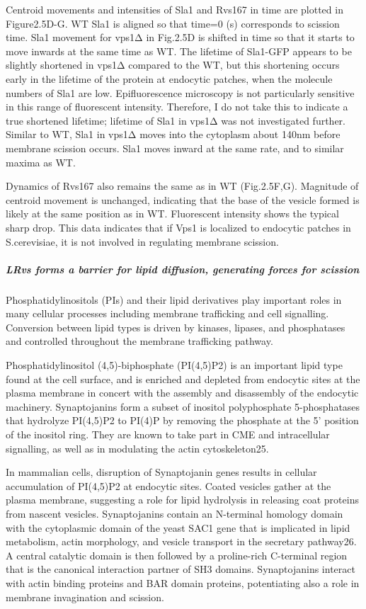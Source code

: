 Centroid movements and intensities of Sla1 and Rvs167 in time are plotted in Figure2.5D-G. WT Sla1 is aligned so that time=0 (s) corresponds to scission time. Sla1 movement for vps1Δ in Fig.2.5D is shifted in time so that it starts to move inwards at the same time as WT. The lifetime of Sla1-GFP appears to be slightly shortened in vps1Δ compared to the WT, but this shortening occurs early in the lifetime of the protein at endocytic patches, when the molecule numbers of Sla1 are low. Epifluorescence microscopy is not particularly sensitive in this range of fluorescent intensity. Therefore, I do not take this to indicate a true shortened lifetime; lifetime of Sla1 in vps1Δ was not investigated further. Similar to WT, Sla1 in vps1Δ moves into the cytoplasm about 140nm before membrane scission occurs. Sla1 moves inward at the same rate, and to similar maxima as WT. 

Dynamics of Rvs167 also remains the same as in WT (Fig.2.5F,G). Magnitude of centroid movement is unchanged, indicating that the base of the vesicle formed is likely at the same position as in WT. Fluorescent intensity shows the typical sharp drop. This data indicates that if Vps1 is localized to endocytic patches in S.cerevisiae, it is not involved in regulating membrane scission.  

	\subparagraph{ LRvs forms a barrier for lipid diffusion, generating forces for scission
}
Phosphatidylinositols (PIs) and their lipid derivatives play important roles in many cellular processes including membrane trafficking and cell signalling. Conversion between lipid types is driven by kinases, lipases, and phosphatases and controlled throughout the membrane trafficking pathway. 

Phosphatidylinositol (4,5)-biphosphate (PI(4,5)P2) is an important lipid type found at the cell surface, and is enriched and depleted from endocytic sites at the plasma membrane in concert with the assembly and disassembly of the endocytic machinery. Synaptojanins form a subset of inositol polyphosphate 5-phosphatases that hydrolyze PI(4,5)P2 to PI(4)P by removing the phosphate at the 5’ position of the inositol ring. They are known to take part in CME and intracellular signalling, as well as in modulating the actin cytoskeleton25. 

In mammalian cells, disruption of Synaptojanin genes results in cellular accumulation of PI(4,5)P2 at endocytic sites. Coated vesicles gather at the plasma membrane, suggesting a role for lipid hydrolysis in releasing coat proteins from nascent vesicles. Synaptojanins contain an N-terminal homology domain with the cytoplasmic domain of the yeast SAC1 gene that is implicated in lipid metabolism, actin morphology, and vesicle transport in the secretary pathway26. A central catalytic domain is then followed by a proline-rich C-terminal region that is the canonical interaction partner of SH3 domains. Synaptojanins interact with actin binding proteins and BAR domain proteins, potentiating also a role in membrane invagination and scission. 

